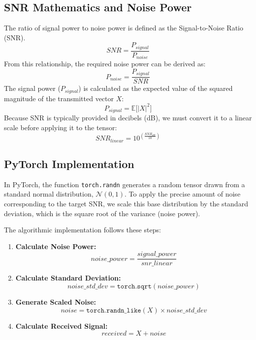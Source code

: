 \documentclass[12pt, a4paper, twocolumn]{article}
\begin{document}
\subsection{\textbf{SNR Mathematics and Noise Power}}
The ratio of signal power to noise power is defined as the Signal-to-Noise Ratio (SNR).
\begin{equation}
    SNR = \frac{P_{signal}}{P_{noise}}
\end{equation}
From this relationship, the required noise power can be derived as:
\begin{equation}
    P_{noise} = \frac{P_{signal}}{SNR}
\end{equation}
The signal power ($P_{signal}$) is calculated as the expected value of the squared magnitude of the transmitted vector $X$:
\begin{equation}
    P_{signal} = \mathbb{E}\big[|X|^2\big]
\end{equation}
Because SNR is typically provided in decibels (dB), we must convert it to a linear scale before applying it to the tensor:
\begin{equation}
    SNR_{linear} = 10^{\left(\frac{SNR_{dB}}{10}\right)}
\end{equation}

\subsection{\textbf{PyTorch Implementation}}
In PyTorch, the function \texttt{torch.randn} generates a random tensor drawn from a standard normal distribution, $\mathcal{N}(0,1)$. To apply the precise amount of noise corresponding to the target SNR, we scale this base distribution by the standard deviation, which is the square root of the variance (noise power).

The algorithmic implementation follows these steps:
\begin{enumerate}
    \item \textbf{Calculate Noise Power:}
    \begin{equation}
        noise\_power = \frac{signal\_power}{snr\_linear}
    \end{equation}
    \item \textbf{Calculate Standard Deviation:}
    \begin{equation}
        noise\_std\_dev = \texttt{torch.sqrt}(noise\_power)
    \end{equation}
    \item \textbf{Generate Scaled Noise:}
    \begin{equation}
        noise = \texttt{torch.randn\_like}(X) \times noise\_std\_dev
    \end{equation}
    \item \textbf{Calculate Received Signal:}
    \begin{equation}
        received = X + noise
    \end{equation}
\end{enumerate}
\end{document}
